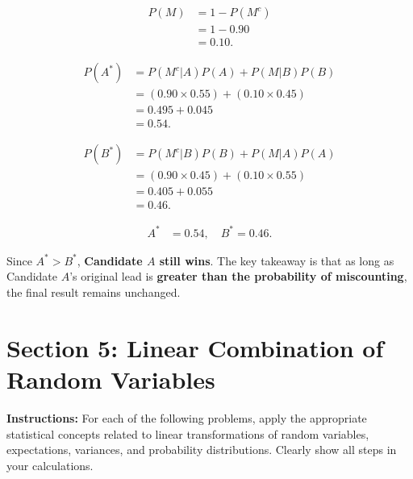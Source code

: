 \documentclass{article}
\begin{document}
\begin{enumerate}
{    \begin{align*}
    P(M) &= 1 - P(M^c) \\
    &= 1 - 0.90 \\
    &= 0.10.
    \end{align*}

    \begin{align*}
    P(A^*) &= P(M^c | A) P(A) + P(M | B) P(B) \\
    &= (0.90 \times 0.55) + (0.10 \times 0.45) \\
    &= 0.495 + 0.045 \\
    &= 0.54.
    \end{align*}

    \begin{align*}
    P(B^*) &= P(M^c | B) P(B) + P(M | A) P(A) \\
    &= (0.90 \times 0.45) + (0.10 \times 0.55) \\
    &= 0.405 + 0.055 \\
    &= 0.46.
    \end{align*}

    \begin{align*}
    A^* &= 0.54, \quad B^* = 0.46.
    \end{align*}

    Since \( A^* > B^* \), \textbf{Candidate \( A \) still wins}. The key takeaway is that as long as Candidate \( A \)'s original lead is \textbf{greater than the probability of miscounting}, the final result remains unchanged.
    }
\end{enumerate}


\newpage
\section*{Section 5: Linear Combination of Random Variables}

\noindent\textbf{Instructions:}  
For each of the following problems, apply the appropriate statistical concepts related to linear transformations of random variables, expectations, variances, and probability distributions. Clearly show all steps in your calculations.
\end{document}
